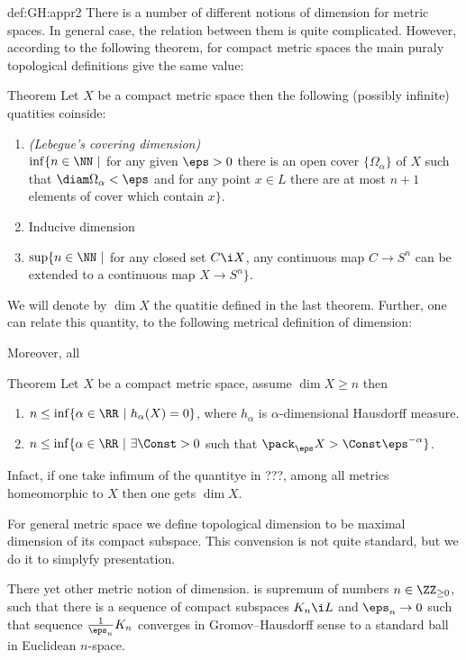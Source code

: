 {\begin{subthm}{def:GH:appr2}
There is a number of different notions of dimension for metric spaces.
In general case, the relation between them is quite complicated.
However, according to the following theorem, for compact metric spaces the main puraly topological definitions give the same value:

\begin{thm}{Theorem} Let $X$ be a compact metric space then the following (possibly infinite) quatities coinside:
\begin{enumerate}
\item\textit{(Lebegue's covering dimension)}\\
$\inf\{n\in \NN\ |$ for any given $\eps>0$ there is an open cover $\{\Omega_\alpha\}$ of $X$ such that $\diam\Omega_\alpha<\eps$ and for any point $x\in L$ there are at most $n+1$ elements of cover which contain $x\}$.
\item Inducive dimension
\item $\sup\{n\in \NN\ |$ for any closed set $C\i X$, any continuous map $C\to S^{n}$ can be extended to a continuous map $X\to S^n\}$.
\end{enumerate}
\end{thm}

We will denote by $\dim X$ the quatitie defined in the last theorem.
Further, one can relate this quantity, to the following metrical definition of dimension:

Moreover, all
\begin{thm}{Theorem}
Let $X$ be a compact metric space, assume $\dim X\ge n$ then
\begin{enumerate}
\item $n\le \inf\{\alpha\in\RR\ |\ h_\alpha(X)=0\}$, where $h_\alpha$ is $\alpha$-dimensional Hausdorff measure.
\item $n\le \inf\{\alpha\in\RR\ |\ \exists\Const>0$ such that $\pack_\eps X>\Const\eps^{-\alpha}\}$.
\end{enumerate}
\end{thm}

Infact, if one take infimum of the quantitye in ???, among all metrics homeomorphic to $X$ then one gets $\dim X$.



For general metric space we define topological dimension to be maximal dimension of its compact subspace.
This convension is not quite standard, but we do it to simplyfy presentation.

There yet other metric notion of dimension.
is supremum of numbers $n\in \ZZ_{\ge0}$, such that there is a sequence of compact subspaces $K_n\i L$ and $\eps_n\to 0$ such that sequence $\tfrac1{\eps_n}K_n$ converges in Gromov--Hausdorff sense to a standard ball in Euclidean $n$-space.


\end{subthm}}
